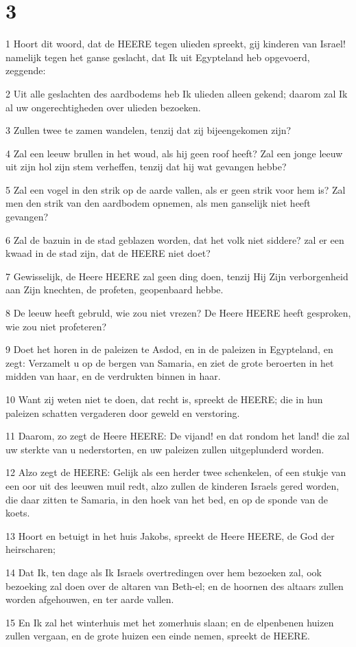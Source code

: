 \chapter{3}

\par 1 Hoort dit woord, dat de HEERE tegen ulieden spreekt, gij kinderen van Israel! namelijk tegen het ganse geslacht, dat Ik uit Egypteland heb opgevoerd, zeggende:
\par 2 Uit alle geslachten des aardbodems heb Ik ulieden alleen gekend; daarom zal Ik al uw ongerechtigheden over ulieden bezoeken.
\par 3 Zullen twee te zamen wandelen, tenzij dat zij bijeengekomen zijn?
\par 4 Zal een leeuw brullen in het woud, als hij geen roof heeft? Zal een jonge leeuw uit zijn hol zijn stem verheffen, tenzij dat hij wat gevangen hebbe?
\par 5 Zal een vogel in den strik op de aarde vallen, als er geen strik voor hem is? Zal men den strik van den aardbodem opnemen, als men ganselijk niet heeft gevangen?
\par 6 Zal de bazuin in de stad geblazen worden, dat het volk niet siddere? zal er een kwaad in de stad zijn, dat de HEERE niet doet?
\par 7 Gewisselijk, de Heere HEERE zal geen ding doen, tenzij Hij Zijn verborgenheid aan Zijn knechten, de profeten, geopenbaard hebbe.
\par 8 De leeuw heeft gebruld, wie zou niet vrezen? De Heere HEERE heeft gesproken, wie zou niet profeteren?
\par 9 Doet het horen in de paleizen te Asdod, en in de paleizen in Egypteland, en zegt: Verzamelt u op de bergen van Samaria, en ziet de grote beroerten in het midden van haar, en de verdrukten binnen in haar.
\par 10 Want zij weten niet te doen, dat recht is, spreekt de HEERE; die in hun paleizen schatten vergaderen door geweld en verstoring.
\par 11 Daarom, zo zegt de Heere HEERE: De vijand! en dat rondom het land! die zal uw sterkte van u nederstorten, en uw paleizen zullen uitgeplunderd worden.
\par 12 Alzo zegt de HEERE: Gelijk als een herder twee schenkelen, of een stukje van een oor uit des leeuwen muil redt, alzo zullen de kinderen Israels gered worden, die daar zitten te Samaria, in den hoek van het bed, en op de sponde van de koets.
\par 13 Hoort en betuigt in het huis Jakobs, spreekt de Heere HEERE, de God der heirscharen;
\par 14 Dat Ik, ten dage als Ik Israels overtredingen over hem bezoeken zal, ook bezoeking zal doen over de altaren van Beth-el; en de hoornen des altaars zullen worden afgehouwen, en ter aarde vallen.
\par 15 En Ik zal het winterhuis met het zomerhuis slaan; en de elpenbenen huizen zullen vergaan, en de grote huizen een einde nemen, spreekt de HEERE.


